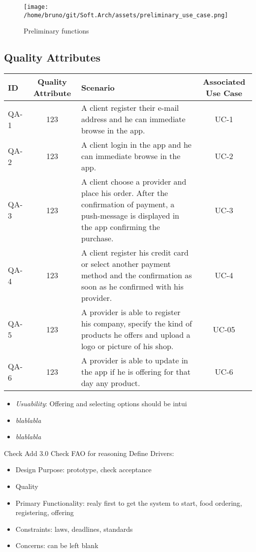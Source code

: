 \begin{figure}[htb]
    \centering
    \texttt{[image: /home/bruno/git/Soft.Arch/assets/preliminary\_use\_case.png]}
    \caption{Preliminary functions}
    \label{fig:predes}
\end{figure}


\subsection*{Quality Attributes}

\begin{table}[H]
\begin{tabularx}{\textwidth}{lcXc}
    \toprule
    ID & Quality Attribute & Scenario & Associated Use Case  \\
    \midrule
    QA-1 & 123 & A client register their e-mail address and he can immediate browse in the app. & UC-1 \\
    QA-2 & 123 & A client login in the app and he can immediate browse in the app. & UC-2 \\
    QA-3 & 123 & A client choose a provider and place his order. After the confirmation
    of payment, a push-message is displayed in the app confirming the purchase. & UC-3 \\
    QA-4 & 123 & A client register his credit card or select another payment method and the
    confirmation as soon as he confirmed with his provider. & UC-4 \\
    QA-5 & 123 & A provider is able to register his company, specify the kind of products he offers and upload
    a logo or picture of his shop. & UC-05 \\
    QA-6 & 123 & A provider is able to update in the app if he is offering for that day any product. &  UC-6 \\
    \bottomrule
\end{tabularx}
\end{table}




\begin{itemize}
    \item \textit{Usuability}: Offering and selecting options should be intui
    \item \textit{blablabla}
    \item \textit{blablabla}
\end{itemize}


Check Add 3.0
Check FAO for reasoning
Define Drivers:

\begin{itemize}
    \item Design Purpose: prototype, check acceptance
    \item Quality
    \item Primary Functionality: realy first to get the system to start, food ordering, registering, offering
    \item Constraints: laws, deadlines, standards
    \item Concerns: can be left blank
\end{itemize}


